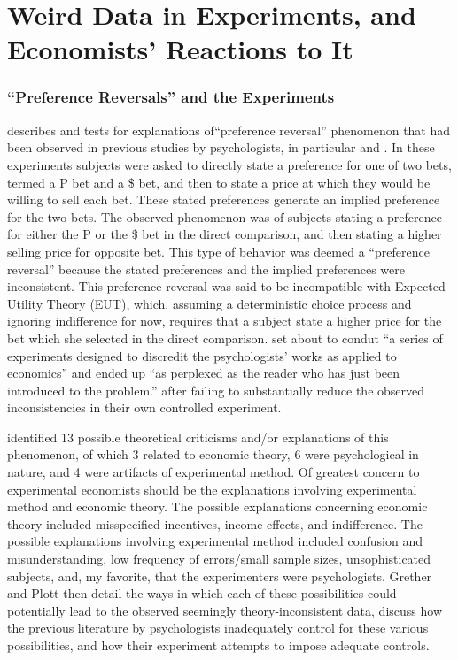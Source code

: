 
\onehalfspacing
\chapter{Weird Data in Experiments, and Economists' Reactions to It}


\subsection{\enquote{Preference Reversals} and the \texorpdfstring{\textcite{Grether1979}}{Grether \& Plott (1979)}  Experiments}

\textcite{Grether1979} describes and tests for explanations of\enquote{preference reversal} phenomenon that had been observed in previous studies by psychologists, in particular \textcite{Lichtenstein1971, Lichtenstein1973} and \textcite{Lindman1971}.
In these experiments subjects were asked to directly state a preference for one of two bets, termed a P bet and a \$ bet,  and then to state a price at which they would be willing to sell each bet.
These stated preferences generate an implied preference for the two bets.
The observed phenomenon was of subjects stating a preference for either the P or the \$ bet in the direct comparison, and then stating a higher selling price for opposite bet.
This type of behavior was deemed a \enquote{preference reversal} because the stated preferences and the implied preferences were inconsistent.
This preference reversal was said to be incompatible with Expected Utility Theory (EUT), which, assuming a deterministic choice process and ignoring indifference for now, requires that a subject state a higher price for the bet which she selected in the direct comparison.
\textcite[623]{Grether1979} set about to condut \enquote{a series of experiments designed to discredit the psychologists' works as applied to economics} and ended up \enquote{as perplexed as the reader who has just been introduced to the problem.} \parencite*[624]{Grether1979} after failing to substantially reduce the observed inconsistencies in their own controlled experiment.

\textcite{Grether1979} identified 13 possible theoretical criticisms and/or explanations of this phenomenon, of which 3 related to economic theory, 6 were psychological in nature, and 4 were artifacts of experimental method.
Of greatest concern to experimental economists should be the explanations involving experimental method and economic theory.
The possible explanations concerning economic theory included misspecified incentives, income effects, and indifference.
The possible explanations involving experimental method included confusion and misunderstanding, low frequency of errors/small sample sizes, unsophisticated subjects, and, my favorite, that the experimenters were psychologists.
Grether and Plott then detail the ways in which each of these possibilities could potentially lead to the observed seemingly theory-inconsistent data, discuss how the previous literature by psychologists inadequately control for these various possibilities, and how their experiment attempts to impose adequate controls.


